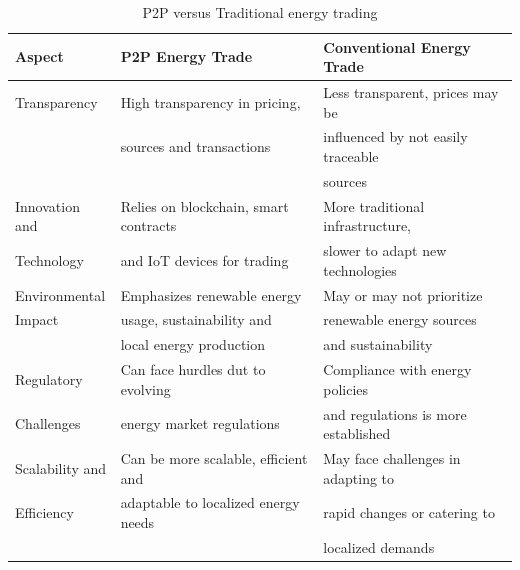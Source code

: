 \begin{table}[h!]
    \begin{tabular}[rounded-corners]{l|ll}
        \textbf{Aspect} & \textbf{P2P Energy Trade}             & \textbf{Conventional Energy Trade}  \\
        \hline
        Transparency    & High transparency in pricing,         & Less transparent, prices may be     \\
                        & sources and transactions              & influenced by not easily traceable  \\
                        &                                       & sources                             \\[5pt]
        Innovation and  & Relies on blockchain, smart contracts & More traditional infrastructure,    \\
        Technology      & and IoT devices for trading           & slower to adapt new technologies    \\ [5pt]
        Environmental   & Emphasizes renewable energy           & May or may not prioritize           \\
        Impact          & usage, sustainability and             & renewable energy sources            \\
                        & local energy production               & and sustainability                  \\[5pt]
        Regulatory      & Can face hurdles dut to evolving      & Compliance with energy policies     \\
        Challenges      & energy market regulations             & and regulations is more established \\[5pt]
        Scalability and & Can be more scalable, efficient and   & May face challenges in adapting to  \\
        Efficiency      & adaptable to localized energy needs   & rapid changes or catering to        \\
                        &                                       & localized demands                   \\[5pt]
    \end{tabular}
    \caption{P2P versus Traditional energy trading}
\end{table}

